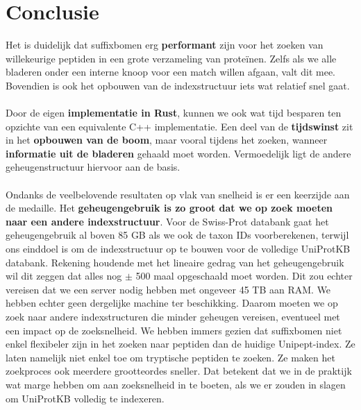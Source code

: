 \section{Conclusie}\label{sec:conclusie-suffix-bomen}
Het is duidelijk dat suffixbomen erg \textbf{performant} zijn voor het zoeken van willekeurige peptiden in een grote verzameling van proteïnen.
Zelfs als we alle bladeren onder een interne knoop voor een match willen afgaan, valt dit mee.
Bovendien is ook het opbouwen van de indexstructuur iets wat relatief snel gaat.
\\ \\
Door de eigen \textbf{implementatie in Rust}, kunnen we ook wat tijd besparen ten opzichte van een equivalente C++ implementatie.
Een deel van de \textbf{tijdswinst} zit in het\textbf{ opbouwen van de boom}, maar vooral tijdens het zoeken, wanneer \textbf{informatie uit de bladeren} gehaald moet worden.
Vermoedelijk ligt de andere geheugenstructuur hiervoor aan de basis.
\\ \\
Ondanks de veelbelovende resultaten op vlak van snelheid is er een keerzijde aan de medaille.
Het \textbf{geheugengebruik is zo groot dat we op zoek moeten naar een andere indexstructuur}.
Voor de Swiss-Prot databank gaat het geheugengebruik al boven 85 GB als we ook de taxon IDs voorberekenen, terwijl ons einddoel is om de indexstructuur op te bouwen voor de volledige UniProtKB databank.
Rekening houdende met het lineaire gedrag van het geheugengebruik wil dit zeggen dat alles nog $\pm$ 500 maal opgeschaald moet worden.
Dit zou echter vereisen dat we een server nodig hebben met ongeveer 45 TB aan RAM\@.
We hebben echter geen dergelijke machine ter beschikking.
Daarom moeten we op zoek naar andere indexstructuren die minder geheugen vereisen, eventueel met een impact op de zoeksnelheid.
We hebben immers gezien dat suffixbomen niet enkel flexibeler zijn in het zoeken naar peptiden dan de huidige Unipept-index.
Ze laten namelijk niet enkel toe om tryptische peptiden te zoeken.
Ze maken het zoekproces ook meerdere grootteordes sneller.
Dat betekent dat we in de praktijk wat marge hebben om aan zoeksnelheid in te boeten, als we er zouden in slagen om UniProtKB volledig te indexeren.
